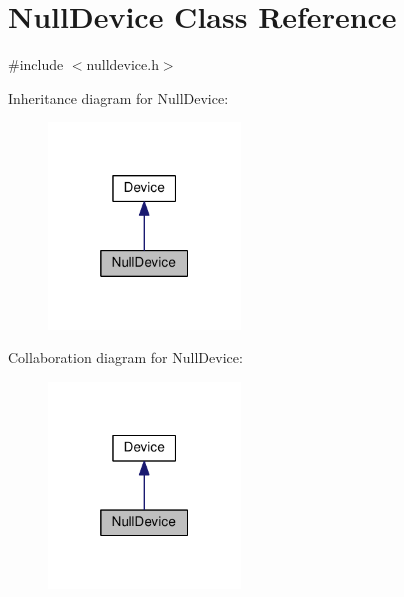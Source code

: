 \hypertarget{class_null_device}{}\section{Null\+Device Class Reference}
\label{class_null_device}


{\ttfamily \#include $<$nulldevice.\+h$>$}



Inheritance diagram for Null\+Device\+:\nopagebreak
\begin{figure}[H]
\begin{center}
\leavevmode
\includegraphics[width=145pt]{class_null_device__inherit__graph}
\end{center}
\end{figure}


Collaboration diagram for Null\+Device\+:\nopagebreak
\begin{figure}[H]
\begin{center}
\leavevmode
\includegraphics[width=145pt]{class_null_device__coll__graph}
\end{center}
\end{figure}
